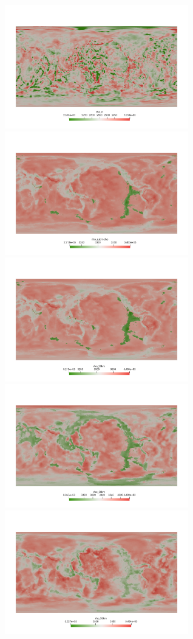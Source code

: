 \begin{center}
\includegraphics[width=8cm]{python_codes/fieldstone_99/images/rho_c}
\includegraphics[width=8cm]{python_codes/fieldstone_99/images/rho_submoho}\\
\includegraphics[width=8cm]{python_codes/fieldstone_99/images/rho_20}
\includegraphics[width=8cm]{python_codes/fieldstone_99/images/rho_36}\\
\includegraphics[width=8cm]{python_codes/fieldstone_99/images/rho_56}

\end{center}
